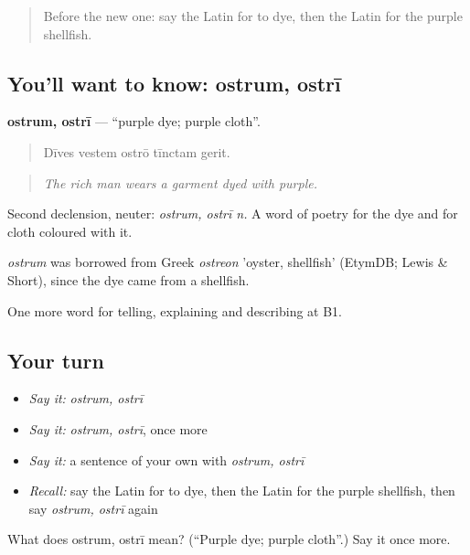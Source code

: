 \begin{quote}
Before the new one: say the Latin for to dye, then the Latin for the purple shellfish.
\end{quote}

\subsection*{You'll want to know: ostrum, ostrī}
\textbf{ostrum, ostrī} — \textquotedblleft{}purple dye; purple cloth\textquotedblright{}.

\begin{quote}
Dīves vestem ostrō tīnctam gerit.
\end{quote}

\begin{quote}
\emph{The rich man wears a garment dyed with purple.}
\end{quote}

Second declension, neuter: \emph{ostrum, ostrī n.} A word of poetry for the dye and for cloth coloured with it.

\begin{cousinweb}
\emph{ostrum} was borrowed from Greek \emph{ostreon} 'oyster, shellfish' (EtymDB; Lewis \& Short), since the dye came from a shellfish.
\end{cousinweb}

\begin{grammarlens}[title={What you've built}]
One more word for telling, explaining and describing at B1.
\end{grammarlens}

\subsection*{Your turn}
\begin{itemize}
\raggedright
  \item \emph{Say it:} \emph{ostrum, ostrī}
  \item \emph{Say it:} \emph{ostrum, ostrī}, once more
  \item \emph{Say it:} a sentence of your own with \emph{ostrum, ostrī}
  \item \emph{Recall:} say the Latin for to dye, then the Latin for the purple shellfish, then say \emph{ostrum, ostrī} again
\end{itemize}

\begin{tcolorbox}[breakable,colback=teal!4,colframe=teal!35!black,title={Before you move on}]
What does ostrum, ostrī mean? (\textquotedblleft{}Purple dye; purple cloth\textquotedblright{}.) Say it once more.
\end{tcolorbox}
